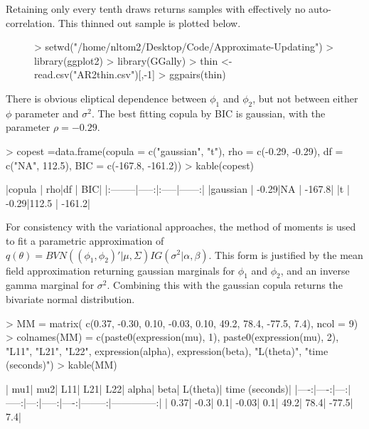 \documentclass{article}
\begin{document}
Retaining only every tenth draws returns samples with effectively no auto-correlation. This thinned out sample is plotted below.

\begin{figure}
\begin{Schunk}
\begin{Sinput}
> setwd("/home/nltom2/Desktop/Code/Approximate-Updating")
> library(ggplot2)
> library(GGally)
> thin <- read.csv("AR2thin.csv")[,-1]
> ggpairs(thin)
\end{Sinput}
\end{Schunk}
\end{figure}

There is obvious eliptical dependence between $\phi_1$ and $\phi_2$, but not between either $\phi$ parameter and $\sigma^2$. The best fitting copula by BIC is gaussian, with the parameter $\rho = -0.29$.

\begin{Schunk}
\begin{Sinput}
> copest =data.frame(copula = c("gaussian", "t"), rho = c(-0.29, -0.29), df = c("NA", 112.5), BIC = c(-167.8, -161.2))
> kable(copest)
\end{Sinput}
\begin{Soutput}
|copula   |   rho|df    |    BIC|
|:--------|-----:|:-----|------:|
|gaussian | -0.29|NA    | -167.8|
|t        | -0.29|112.5 | -161.2|
\end{Soutput}
\end{Schunk}

For consistency with the variational approaches, the method of moments is used to fit a parametric approximation of $q(\theta) = BVN((\phi_1, \phi_2)' | \mu, \Sigma) IG(\sigma^2 | \alpha, \beta)$. This form is justified by the mean field approximation returning gaussian marginals for $\phi_1$ and $\phi_2$, and an inverse gamma marginal for $\sigma^2$. Combining this with the gaussian copula returns the bivariate normal distribution.

\begin{Schunk}
\begin{Sinput}
> MM = matrix( c(0.37, -0.30, 0.10, -0.03, 0.10, 49.2, 78.4, -77.5, 7.4), ncol = 9)
> colnames(MM) = c(paste0(expression(mu), 1), paste0(expression(mu), 2), "L11", "L21", "L22", expression(alpha), expression(beta), "L(theta)", "time (seconds)")
> kable(MM)
\end{Sinput}
\begin{Soutput}
|  mu1|  mu2| L11|   L21| L22| alpha| beta| L(theta)| time (seconds)|
|----:|----:|---:|-----:|---:|-----:|----:|--------:|--------------:|
| 0.37| -0.3| 0.1| -0.03| 0.1|  49.2| 78.4|    -77.5|            7.4|
\end{Soutput}
\end{Schunk}
\end{document}
